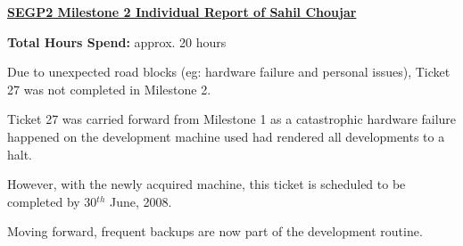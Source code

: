 \documentclass{letter}
\begin{document}
{\large \textbf{\underline{SEGP2 Milestone 2 Individual Report of Sahil Choujar}}}

\textbf{Total Hours Spend:} approx. 20 hours

Due to unexpected road blocks (eg: hardware failure and personal issues), Ticket 27 was not completed in Milestone 2. 

Ticket 27 was carried forward from Milestone 1 as a catastrophic hardware failure happened on the development machine used had rendered all developments to a halt. 

However, with the newly acquired machine, this ticket is scheduled to be completed by 30$^{th}$ June, 2008. 

Moving forward, frequent backups are now part of the development routine. 
\end{document}
